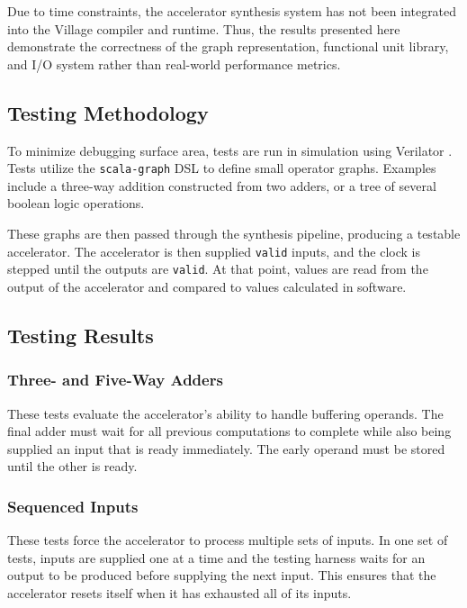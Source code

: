 \documentclass[sigconf, nonacm]{acmart}
\begin{document}
Due to time constraints, the accelerator synthesis system has not been integrated into the Village compiler and runtime.
Thus, the results presented here demonstrate the correctness of the graph representation, functional unit library, and I/O system rather than real-world performance metrics.

\subsection{Testing Methodology}

To minimize debugging surface area, tests are run in simulation using Verilator \cite{verilator}.
Tests utilize the \texttt{scala-graph} DSL to define small operator graphs.
Examples include a three-way addition constructed from two adders, or a tree of several boolean logic operations.

These graphs are then passed through the synthesis pipeline, producing a testable accelerator.
The accelerator is then supplied \texttt{valid} inputs, and the clock is stepped until the outputs are \texttt{valid}.
At that point, values are read from the output of the accelerator and compared to values calculated in software.

\subsection{Testing Results}

\subsubsection{Three- and Five-Way Adders}

These tests evaluate the accelerator's ability to handle buffering operands.
The final adder must wait for all previous computations to complete while also being supplied an input that is ready immediately.
The early operand must be stored until the other is ready.

\subsubsection{Sequenced Inputs}

These tests force the accelerator to process multiple sets of inputs.
In one set of tests, inputs are supplied one at a time and the testing harness waits for an output to be produced before supplying the next input.
This ensures that the accelerator resets itself when it has exhausted all of its inputs.
\end{document}
